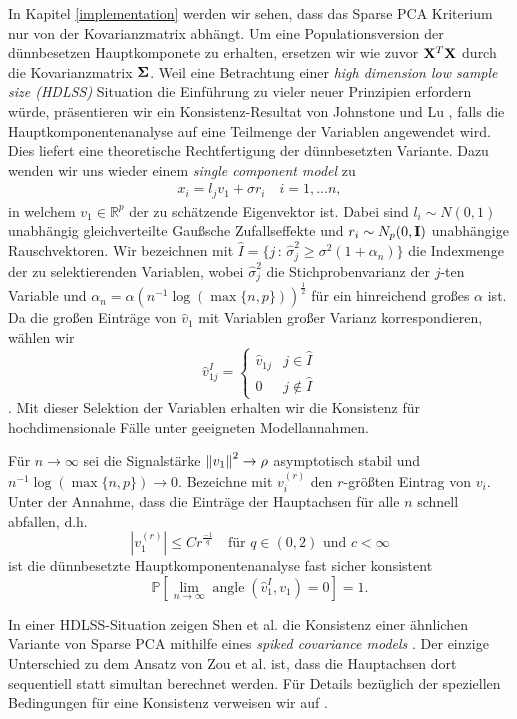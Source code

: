 In Kapitel \ref{implementation} werden wir sehen, dass das Sparse PCA Kriterium nur von der Kovarianzmatrix abhängt. Um eine Populationsversion der dünnbesetzen Hauptkomponete zu erhalten, ersetzen wir wie zuvor $\mathbf{X}^T \mathbf{X}$ durch die Kovarianzmatrix $\mathbf{\Sigma}$. Weil eine Betrachtung einer \textit{high dimension low sample size (HDLSS)} Situation die Einführung zu vieler neuer Prinzipien erfordern würde, präsentieren wir ein Konsistenz-Resultat von Johnstone und Lu \cite{johnstone}, falls die Hauptkomponentenanalyse auf eine Teilmenge der Variablen angewendet wird. Dies liefert eine theoretische Rechtfertigung der dünnbesetzten Variante. Dazu wenden wir uns wieder einem \textit{single component model} zu
\begin{align}
\label{single_component_model_spca}
x_i = l_j v_1 + \sigma r_i \quad i = 1, \ldots n,
\end{align}
in welchem $v_1 \in \mathbb{R}^p$ der zu schätzende Eigenvektor ist. Dabei sind $l_i \sim N(0,1)$ unabhängig gleichverteilte Gaußsche Zufallseffekte und $r_i \sim N_p(0, \mathbf{I})$ unabhängige Rauschvektoren. Wir bezeichnen mit $\widehat{I} = \{j \, \colon \, \widehat{\sigma}_j^2 \geq \sigma^2 (1 + \alpha_n)\}$ die Indexmenge der zu selektierenden Variablen, wobei $\widehat{\sigma}_j^2$ die Stichprobenvarianz der $j$-ten Variable und $\alpha_n = \alpha (n^{-1}\log(\max \{n,p\}))^{\frac{1}{2}}$ für ein hinreichend großes $\alpha$ ist. Da die großen Einträge von $\widehat{v}_1$ mit Variablen großer Varianz korrespondieren, wählen wir 
$$\widehat{v}_{1j}^I = \begin{cases} 
      \widehat{v}_{1j} & j \in \widehat{I}\\
      0 & j \not\in \widehat{I}
   \end{cases}$$.
Mit dieser Selektion der Variablen erhalten wir die Konsistenz für hochdimensionale Fälle unter geeigneten Modellannahmen.

\begin{thm}
Für $n \to \infty$ sei die Signalstärke $\left\lVert v_1 \right\rVert^2 \to \rho$ asymptotisch stabil und $n^{-1}\log(\max \{n,p\}) \to 0$. Bezeichne mit $v_i^{(r)}$ den $r$-größten Eintrag von $v_i$. Unter der Annahme, dass die Einträge der Hauptachsen für alle $n$ schnell abfallen, d.h.
$$|v_1^{(r)}| \leq Cr^{\frac{-1}{q}} \quad \text{für } q \in (0,2) \text{ und } c < \infty$$
ist die dünnbesetzte Hauptkomponentenanalyse fast sicher konsistent
$$\mathbb{P}\left[\lim_{n \to \infty} \operatorname{angle}(\widehat{v}_1^I, v_1) = 0\right] = 1.$$ 
\end{thm}

In einer HDLSS-Situation zeigen Shen et al. die Konsistenz einer ähnlichen Variante von Sparse PCA mithilfe eines \textit{spiked covariance models} \cite{shen}. Der einzige Unterschied zu dem Ansatz von Zou et al. ist, dass die Hauptachsen dort sequentiell statt simultan berechnet werden. Für Details bezüglich der speziellen Bedingungen für eine Konsistenz verweisen wir auf \cite{shen_consistency}.